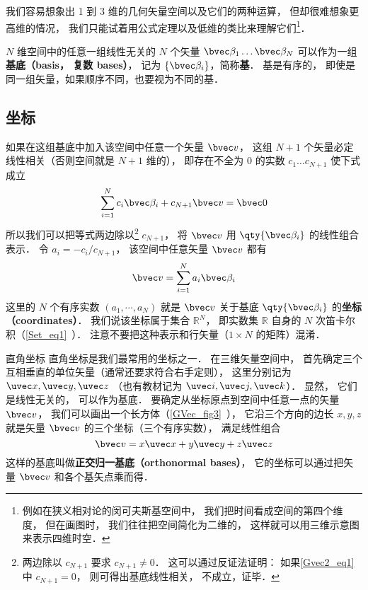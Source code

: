 我们容易想象出 1 到 3 维的几何矢量空间以及它们的两种运算， 但却很难想象更高维的情况， 我们只能试着用公式定理以及低维的类比来理解它们\footnote{例如在狭义相对论的闵可夫斯基空间中， 我们把时间看成空间的第四个维度， 但在画图时， 我们往往把空间简化为二维的， 这样就可以用三维示意图来表示四维时空．}．

$N$ 维空间中的任意一组线性无关的 $N$ 个矢量 $\bvec \beta_1\dots \bvec \beta_N$ 可以作为一组\textbf{基底（basis， 复数 bases）}， 记为 $\{\bvec \beta_i\}$，简称\textbf{基}． 基是有序的， 即使是同一组矢量，如果顺序不同，也要视为不同的基．

\subsection{坐标}
如果在这组基底中加入该空间中任意一个矢量 $\bvec v$， 这组 $N+1$ 个矢量必定线性相关（否则空间就是 $N+1$ 维的）， 即存在不全为 0 的实数 $c_1\dots c_{N+1}$ 使下式成立
\begin{equation}\label{Gvec2_eq1}
\sum_{i=1}^{N} c_i \bvec \beta_i + c_{N+1} \bvec v = \bvec 0
\end{equation}
所以我们可以把等式两边除以\footnote{两边除以 $c_{N+1}$ 要求 $c_{N+1} \ne 0$． 这可以通过反证法证明： 如果\autoref{Gvec2_eq1} 中 $c_{N+1} = 0$， 则可得出基底线性相关， 不成立，证毕．} $c_{N+1}$， 将 $\bvec v$ 用 $\qty{\bvec \beta_i}$ 的线性组合表示． 令 $a_i = -c_i/c_{N+1}$， 该空间中任意矢量 $\bvec v$ 都有
\begin{equation}\label{Gvec2_eq5}
\bvec v = \sum_{i=1}^N a_i \bvec \beta_i
\end{equation}
这里的 $N$ 个有序实数 $(a_1, \cdots, a_N)$ 就是 $\bvec v$ 关于基底 $\qty{\bvec \beta_i}$ 的\textbf{坐标（coordinates）}． 我们说该坐标属于集合 $\mathbb R^N$， 即实数集 $\mathbb R$ 自身的 $N$ 次笛卡尔积（\autoref{Set_eq1}~）． 注意不要把这种表示和行矢量（$1\times N$ 的矩阵）混淆．

\begin{example}{直角坐标}
直角坐标是我们最常用的坐标之一． 在三维矢量空间中， 首先确定三个互相垂直的单位矢量（通常还要求符合右手定则）， 这里分别记为 $\uvec x, \uvec y, \uvec z$ （也有教材记为 $\uvec i, \uvec j, \uvec k$）． 显然， 它们是线性无关的， 可以作为基底． 要确定从坐标原点到空间中任意一点的矢量 $\bvec v$， 我们可以画出一个长方体（\autoref{GVec_fig3}~）， 它沿三个方向的边长 $x, y, z$ 就是矢量 $\bvec v$ 的三个坐标（三个有序实数）， 满足线性组合
\begin{equation}\label{Gvec2_eq4}
\bvec v = x\uvec x + y\uvec y + z\uvec z
\end{equation}
这样的基底叫做\textbf{正交归一基底（orthonormal bases）}， 它的坐标可以通过把矢量 $\bvec v$ 和各个基矢点乘而得．
\end{example}

